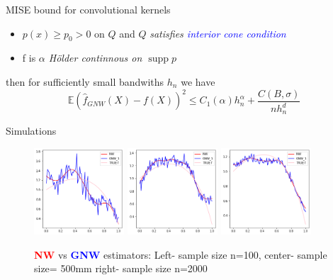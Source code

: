 \documentclass[final,dvipsnames]{beamer}
\newcommand{\myemph}[1]{\textcolor{blue}{#1}}
\newcommand{\myemphh}[1]{\textbf{\textcolor{blue}{#1}}}
\newcommand{\myemphr}[1]{\textbf{\textcolor{red}{#1}}}
\DeclareMathOperator\supp{supp}
\begin{document}
\begin{frame}
\begin{columns}[T]
\begin{column}{0.49\textwidth}
\begin{block}{MISE bound for convolutional kernels}
{\begin{itemize}
        \item $p(x)\geq p_0>0$ on $Q$ and $Q$ \textit{satisfies \myemph{interior cone condition}}
        \item f is \textit{$\alpha$ Hölder continnous on $\supp{p}$}
    \end{itemize}
    then for sufficiently small bandwiths $h_n$ we have
        \begin{equation*}
            \mathbb{E}(\hat{f}_{GNW}(X)-f(X))^2\leq C_1(\alpha)h_n^{\alpha}+\frac{C(B,\sigma)}{nh_n^d}
        \end{equation*}}
\end{block}


\begin{block}{Simulations}
    \begin{figure}
        \centering
        \includegraphics[width=0.3\textwidth]{trueSMALLsample.png}
        \includegraphics[width=0.3\textwidth]{trueMEDsample.png}
        \includegraphics[width=0.3\textwidth]{trueLARGEsample.png}
        \caption{\myemphr{NW} vs \myemphh{GNW} estimators: Left- sample size n=100, center- sample size= 500mm right- sample size n=2000}
    \end{figure}
    
\end{block}




\end{column}
\end{columns}
\end{frame}
\end{document}
